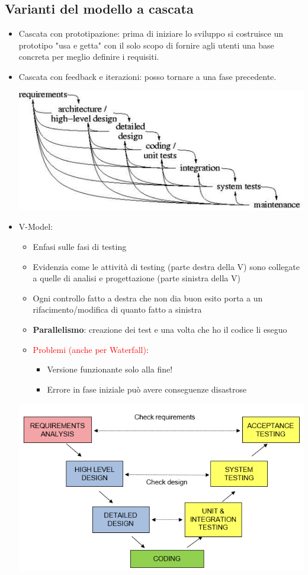 \documentclass[12pt, a4paper]{report}
\begin{document}
\subsection{Varianti del modello a cascata}
\begin{itemize}
    \item Cascata con prototipazione: prima di iniziare lo sviluppo si costruisce un prototipo "usa e getta" con il solo scopo di fornire agli utenti una base concreta per meglio definire i requisiti.
    \item Cascata con feedback e iterazioni: posso tornare a una fase precedente. \begin{center}
        \includegraphics[width=0.8\linewidth]{Immagini/waterfallfeedback.png}
    \end{center}
    \item V-Model: \begin{itemize}
        \item Enfasi sulle fasi di testing
        \item Evidenzia come le attività di testing (parte destra della V) sono collegate a quelle di analisi e progettazione (parte sinistra della V)
        \item Ogni controllo fatto a destra che non dia buon esito porta a un rifacimento/modifica di quanto fatto a sinistra
        \item \textbf{Parallelismo}: creazione dei test e una volta che ho il codice li eseguo
        \item \textcolor{red}{Problemi (anche per Waterfall)}: \begin{itemize}
            \item Versione funzionante solo alla fine!
            \item Errore in fase iniziale può avere conseguenze disastrose
        \end{itemize}
    \end{itemize}
    \begin{center}
        \includegraphics[width=0.5\linewidth]{Immagini/vmodel.png}
    \end{center}
\end{itemize}
\end{document}

